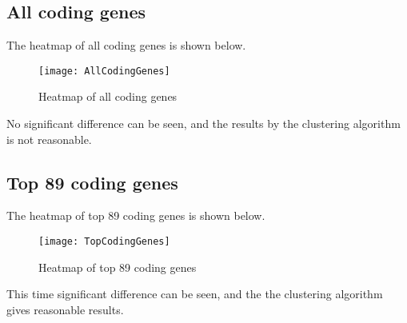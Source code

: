 \documentclass[en,black,12pt,normal]{elegantnote}
\begin{document}
\subsection{All coding genes}
The heatmap of all coding genes is shown below.

\begin{figure}[H]
    \centering
    \texttt{[image: AllCodingGenes]}
    \caption{Heatmap of all coding genes}
    \label{ACG}
\end{figure}

No significant difference can be seen, 
and the results by the clustering algorithm is not reasonable.


\subsection{Top 89 coding genes}
The heatmap of top 89 coding genes is shown below.

\begin{figure}[H]
    \centering
    \texttt{[image: TopCodingGenes]}
    \caption{Heatmap of top 89 coding genes}
    \label{TCG}
\end{figure}

This time significant difference can be seen, 
and the the clustering algorithm gives reasonable results.





























































{}
\end{document}
